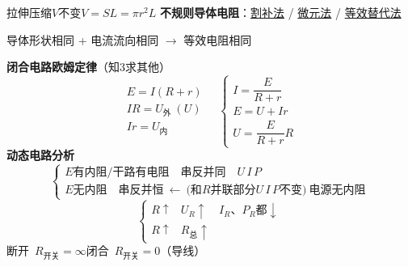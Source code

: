 拉伸压缩\quad $V$不变\quad $V=SL=\pi r^2L$%
\textbf{不规则导体电阻}：\underline{割补法} / \underline{微元法} / \underline{等效替代法}

导体形状相同 + 电流流向相同 $\to$ 等效电阻相同

\textbf{闭合电路欧姆定律}（知3求其他）
\[
\begin{array}{l}
E=I(R+r)\\[8pt]
IR=U_{\text{外}}\ (U)\\[8pt]
Ir=U_{\text{内}}
\end{array}
\quad
\left\{\begin{array}{l}
I=\dfrac{E}{R+r}\\[8pt]
E=U+Ir\\[6pt]
U=\dfrac{E}{R+r}R
\end{array}\right.
\]
\textbf{动态电路分析}
\[
\left\{\begin{array}{l}
\text{$E$有内阻/干路有电阻}\quad\text{串反并同}\quad U\,I\,P\\[4pt]
\text{$E$无内阻}\quad\text{串反并恒}\ \leftarrow\ \text{(和$R$并联部分$U\,I\,P$不变)}\ \text{电源无内阻}
\end{array}\right.
\]
\[
\left\{\begin{array}{lll}
R\uparrow & U_R\uparrow & I_R\text{、}P_R\text{都}\downarrow\\[4pt]
R\uparrow & R_{\text{总}}\uparrow &
\end{array}\right.
\]
断开\ $R_{\text{开关}}=\infty$\quad {}闭合\ $R_{\text{开关}}=0$（导线）
